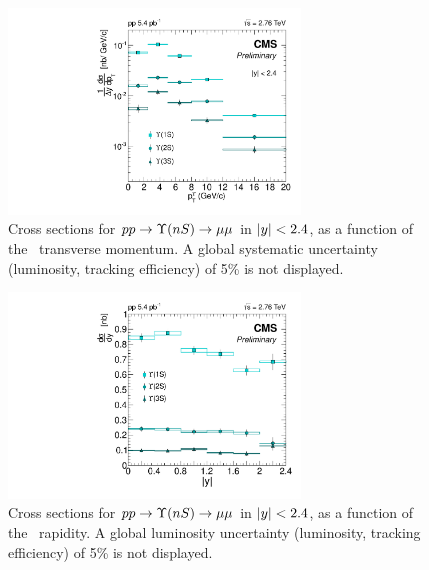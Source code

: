 \begin{figure}
\begin{centering}  
  \includegraphics[width=0.69\textwidth]{Chapters/aUpsilon/CS1S_ppPt.pdf}
  \caption{Cross sections for $pp \to \Upsilon(nS) \to \mu\mu$ in $\vert y\vert < 2.4$, as a function of the \PgU\ transverse
    momentum. A global systematic uncertainty (luminosity, tracking efficiency) of 5\% is not displayed.}
  \label{fig:ppCrossSections_pt}
\end{centering}  
\end{figure}
\begin{figure}
\begin{centering}  
  \includegraphics[width=0.69\textwidth]{Chapters/aUpsilon/CS1S_ppRap_lin.pdf}
  \caption{Cross sections for $pp \to \Upsilon(nS) \to \mu\mu$ in $\vert y\vert < 2.4$, as a function of the \PgU\ rapidity. A global luminosity uncertainty (luminosity, tracking efficiency) of 5\% is not displayed.}
  \label{fig:ppCrossSections_y}
\end{centering}  
\end{figure}


